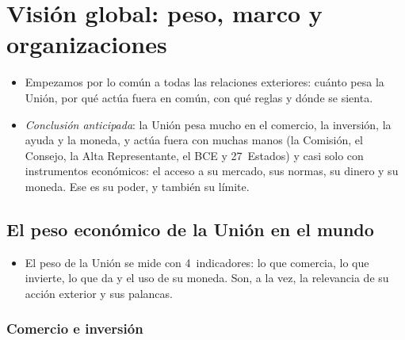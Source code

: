 \documentclass[11pt]{article}
\begin{document}
\section{Visión global: peso, marco y organizaciones}\label{sec:global}

\begin{itemize}
\item Empezamos por lo común a todas las relaciones exteriores: cuánto pesa la Unión, por qué actúa fuera en común, con qué reglas y dónde se sienta.
\item \emph{Conclusión anticipada}: la Unión pesa mucho en el comercio, la inversión, la ayuda y la moneda, y actúa fuera con muchas manos (la Comisión, el Consejo, la Alta Representante, el BCE y 27~Estados) y casi solo con instrumentos económicos: el acceso a su mercado, sus normas, su dinero y su moneda. Ese es su poder, y también su límite.
\end{itemize}

\subsection{El peso económico de la Unión en el mundo}\label{sec:peso}

\begin{itemize}
\item El peso de la Unión se mide con 4~indicadores: lo que comercia, lo que invierte, lo que da y el uso de su moneda. Son, a la vez, la relevancia de su acción exterior y sus palancas.
\end{itemize}

\subsubsection{Comercio e inversión}\label{sec:datos-peso}
\end{document}
